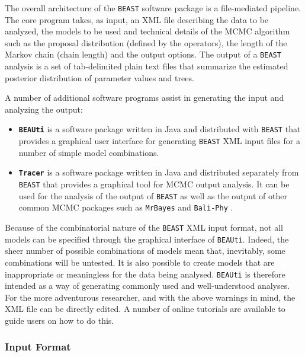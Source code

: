 \documentclass[cup7b, english]{cupbook}
\begin{document}
The overall architecture of the \texttt{BEAST} software package is a file-mediated
pipeline. The core program takes, as input, an XML file describing
the data to be analyzed, the models to be used and technical details
of the MCMC algorithm such as the proposal distribution (defined by the operators),
the length of the Markov chain (chain length) and the output options. The output of a \texttt{BEAST} analysis
is a set of tab-delimited plain text files that summarize the estimated
posterior distribution of parameter values and trees.

A number of additional software programs assist in generating the
input and analyzing the output:

\begin{itemize}
\item \textbf{\texttt{BEAUti}} is a software package written in Java and
distributed with \texttt{BEAST} that provides a graphical user interface for
generating \texttt{BEAST} XML input files for a number of simple model combinations.
\item \textbf{\texttt{Tracer}} is a software package written in Java and
distributed separately from \texttt{BEAST} that provides a graphical tool for
MCMC output analysis. It can be used for the analysis of the output
of \texttt{BEAST} as well as the output of other common MCMC packages such
as \texttt{MrBayes} \cite{HR2001} and \texttt{Bali-Phy} \cite{SR2006}.
\end{itemize}
Because of the combinatorial nature of the \texttt{BEAST} XML input format,
not all models can be specified through the graphical interface of
\texttt{BEAUti}. Indeed, the sheer number of possible combinations
of models mean that, inevitably, some combinations will
be untested. It is also possible to create models that
are inappropriate or meaningless for the data being analysed. \texttt{BEAUti}
is therefore intended as a way of generating commonly used and well-understood
analyses. For the more adventurous researcher, and with the above
warnings in mind, the XML file can be directly edited. A number of
online tutorials are available to guide users on how to do this.

\subsubsection{Input Format}
\end{document}
